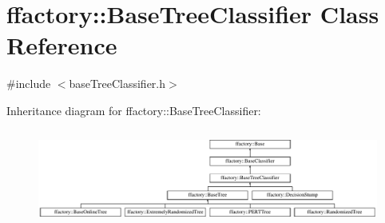 \hypertarget{classffactory_1_1_base_tree_classifier}{\section{ffactory\-:\-:Base\-Tree\-Classifier Class Reference}
\label{classffactory_1_1_base_tree_classifier}
}


{\ttfamily \#include $<$base\-Tree\-Classifier.\-h$>$}

Inheritance diagram for ffactory\-:\-:Base\-Tree\-Classifier\-:\begin{figure}[H]
\begin{center}
\leavevmode
\includegraphics[height=3.196347cm]{classffactory_1_1_base_tree_classifier}
\end{center}
\end{figure}
